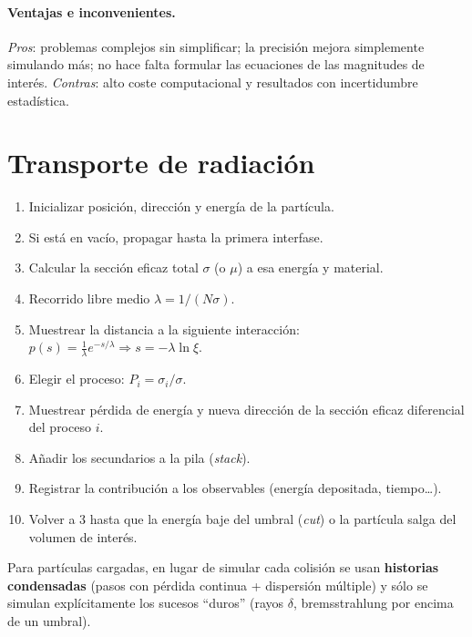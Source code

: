 \paragraph{Ventajas e inconvenientes.} \emph{Pros}: problemas complejos sin simplificar; la precisión mejora simplemente simulando
más; no hace falta formular las ecuaciones de las magnitudes de interés. \emph{Contras}: alto coste computacional y resultados con incertidumbre estadística.

\section{Transporte de radiación}
\begin{clave}
\begin{enumerate}
\item Inicializar posición, dirección y energía de la partícula.
\item Si está en vacío, propagar hasta la primera interfase.
\item Calcular la sección eficaz total $\sigma$ (o $\mu$) a esa energía y material.
\item Recorrido libre medio $\lambda=1/(N\sigma)$.
\item Muestrear la distancia a la siguiente interacción: $p(s)=\frac1\lambda e^{-s/\lambda}\Rightarrow s=-\lambda\ln\xi$.
\item Elegir el proceso: $P_i=\sigma_i/\sigma$.
\item Muestrear pérdida de energía y nueva dirección de la sección eficaz diferencial del proceso $i$.
\item Añadir los secundarios a la pila (\emph{stack}).
\item Registrar la contribución a los observables (energía depositada, tiempo\dots).
\item Volver a 3 hasta que la energía baje del umbral (\emph{cut}) o la partícula salga del volumen de interés.
\end{enumerate}
\end{clave}
Para partículas cargadas, en lugar de simular cada colisión se usan \textbf{historias condensadas} (pasos con pérdida continua + dispersión múltiple) y
sólo se simulan explícitamente los sucesos ``duros'' (rayos $\delta$, bremsstrahlung por encima de un umbral).

